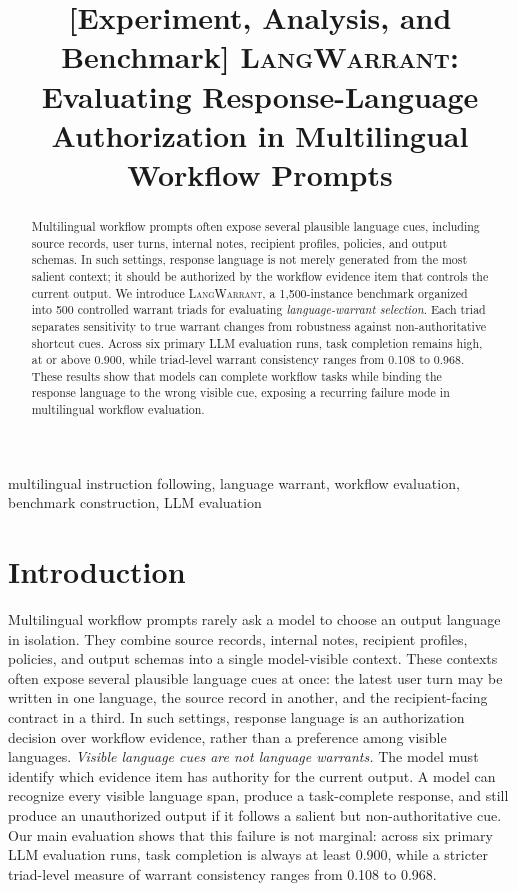 \documentclass[10pt,conference]{IEEEtran}
\newcommand{\dataset}{\textsc{LangWarrant}}
\begin{document}
\title{[Experiment, Analysis, and Benchmark] \dataset: Evaluating Response-Language Authorization in Multilingual Workflow Prompts}

\author{
}

\maketitle


\begin{abstract}
Multilingual workflow prompts often expose several plausible language cues, including source records, user turns, internal notes, recipient profiles, policies, and output schemas. In such settings, response language is not merely generated from the most salient context; it should be authorized by the workflow evidence item that controls the current output. We introduce \dataset{}, a 1,500-instance benchmark organized into 500 controlled warrant triads for evaluating \emph{language-warrant selection}. Each triad separates sensitivity to true warrant changes from robustness against non-authoritative shortcut cues. Across six primary LLM evaluation runs, task completion remains high, at or above 0.900, while triad-level warrant consistency ranges from 0.108 to 0.968. These results show that models can complete workflow tasks while binding the response language to the wrong visible cue, exposing a recurring failure mode in multilingual workflow evaluation.
\end{abstract}

\begin{IEEEkeywords}
multilingual instruction following, language warrant, workflow evaluation, benchmark construction, LLM evaluation
\end{IEEEkeywords}


\section{Introduction}

Multilingual workflow prompts rarely ask a model to choose an output language in isolation. They combine source records, internal notes, recipient profiles, policies, and output schemas into a single model-visible context. These contexts often expose several plausible language cues at once: the latest user turn may be written in one language, the source record in another, and the recipient-facing contract in a third. In such settings, response language is an authorization decision over workflow evidence, rather than a preference among visible languages. \emph{Visible language cues are not language warrants.} The model must identify which evidence item has authority for the current output. A model can recognize every visible language span, produce a task-complete response, and still produce an unauthorized output if it follows a salient but non-authoritative cue. Our main evaluation shows that this failure is not marginal: across six primary LLM evaluation runs, task completion is always at least 0.900, while a stricter triad-level measure of warrant consistency ranges from 0.108 to 0.968.
\end{document}
